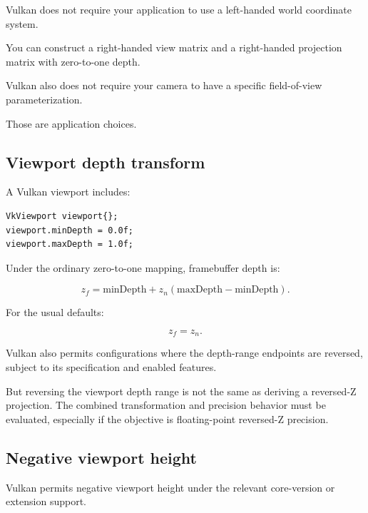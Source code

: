 \hypertarget{02-foundations-ii-ch033-what-vulkan-does-not-prescribe}{}

Vulkan does not require your application to use a left-handed world coordinate system.

You can construct a right-handed view matrix and a right-handed projection matrix with zero-to-one depth.

Vulkan also does not require your camera to have a specific field-of-view parameterization.

Those are application choices.

\subsection{Viewport depth transform}\label{02-foundations-ii-ch033-viewport-depth-transform}

\hypertarget{02-foundations-ii-ch033-viewport-depth-transform}{}

A Vulkan viewport includes:

\begin{verbatim}
VkViewport viewport{};
viewport.minDepth = 0.0f;
viewport.maxDepth = 1.0f;
\end{verbatim}

Under the ordinary zero-to-one mapping, framebuffer depth is:

\[
 \boxed{ z_f= \text{minDepth} + z_n(\text{maxDepth}-\text{minDepth}) }.
\]

For the usual defaults:

\[
 z_f=z_n.
\]

Vulkan also permits configurations where the depth-range endpoints are reversed, subject to its specification and enabled features.

But reversing the viewport depth range is not the same as deriving a reversed-Z projection. The combined transformation and precision behavior must be evaluated, especially if the objective is floating-point reversed-Z precision.

\subsection{Negative viewport height}\label{02-foundations-ii-ch033-negative-viewport-height}

\hypertarget{02-foundations-ii-ch033-negative-viewport-height}{}

Vulkan permits negative viewport height under the relevant core-version or extension support.


